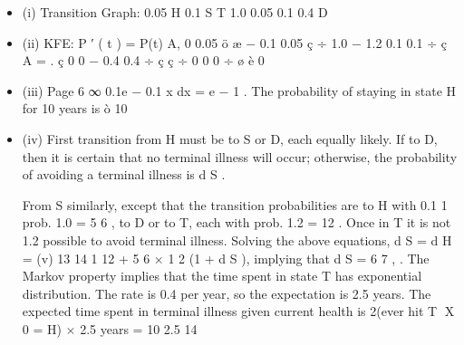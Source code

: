 \documentclass[a4paper,12pt]{article}
\begin{document}
\begin{itemize}
\item (i)
Transition Graph:
0.05
H
0.1
S
T
1.0
0.05
0.1
0.4
D
\item (ii)
KFE: P ′ ( t ) = P(t) A,
0
0.05 ö
æ − 0.1 0.05
ç
÷
1.0 − 1.2 0.1 0.1 ÷
ç
A =
.
ç 0
0
− 0.4 0.4 ÷
ç ç
÷
0
0
0 ÷ ø
è 0

\item (iii)
Page 6
∞
0.1e − 0.1 x dx = e − 1 .
The probability of staying in state H for 10 years is ò 10
\item (iv)
First transition from H must be to S or D, each equally likely. If to D, then it is certain that no terminal illness will occur; otherwise, the probability
of avoiding a terminal illness is d S .

From S similarly, except that the transition probabilities are to H with
0.1
1
prob. 1.0
= 5 6 , to D or to T, each with prob. 1.2
= 12
. Once in T it is not
1.2
possible to avoid terminal illness.
Solving the above equations, d S =
d H =
(v)
13
14
1
12
+
5
6
× 1 2 (1 + d S ), implying that d S =
6
7
,
.
The Markov property implies that the time spent in state T has
exponential distribution. The rate is 0.4 per year, so the expectation is 2.5
years.
The expected time spent in terminal illness given current health is 2(ever
hit T X 0 = H) × 2.5 years =
10
2.5
14

\end{itemize}
\end{document}
